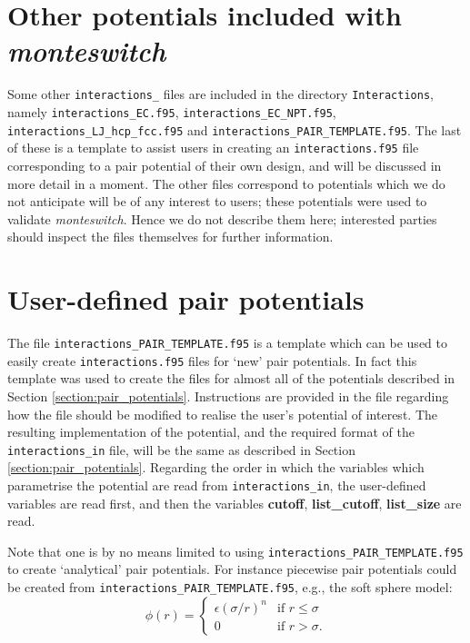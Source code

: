 \documentclass{report}
\begin{document}
\section{Other potentials included with \emph{monteswitch}}
Some other \texttt{interactions\_} files are included in the directory \texttt{Interactions}, namely \texttt{interactions\_EC.f95}, 
\texttt{interactions\_EC\_NPT.f95}, \texttt{interactions\_LJ\_hcp\_fcc.f95} and \texttt{interactions\_PAIR\_TEMPLATE.f95}. The last of
these is a template to assist users in creating an \texttt{interactions.f95} file corresponding to a pair potential of their own
design, and will be discussed in more detail in a moment. The other files correspond to potentials which we do not anticipate will
be of any interest to users; these potentials were used to validate \emph{monteswitch}. Hence we do not describe them here;
interested parties should inspect the files themselves for further information.


\section{User-defined pair potentials}\label{sec:user_defined}
The file \texttt{interactions\_PAIR\_TEMPLATE.f95} is a template which can be used to easily create \texttt{interactions.f95} files for `new'
pair potentials. In fact this template was used to create the files for almost all of the potentials described in Section
\ref{section:pair_potentials}. Instructions are provided in the file regarding how the file should be modified to realise the user's potential
of interest. The resulting implementation of the potential, and the required format of the \texttt{interactions\_in} file, will be the same as described 
in Section \ref{section:pair_potentials}. Regarding the order in which the variables which parametrise the potential are read from 
\texttt{interactions\_in}, the user-defined variables are read first, and then the variables \textbf{cutoff}, \textbf{list\_cutoff}, 
\textbf{list\_size} are read.

Note that one is by no means limited to using \texttt{interactions\_PAIR\_TEMPLATE.f95} to create `analytical' pair potentials. For instance
piecewise pair potentials could be created from \texttt{interactions\_PAIR\_TEMPLATE.f95}, e.g., the soft sphere model:
\begin{equation}
\phi(r)=
\begin{cases} 
\epsilon(\sigma/r)^n & \text{if }r\leq\sigma \\
0 & \text{if }r>\sigma.
\end{cases}
\end{equation}
\end{document}
